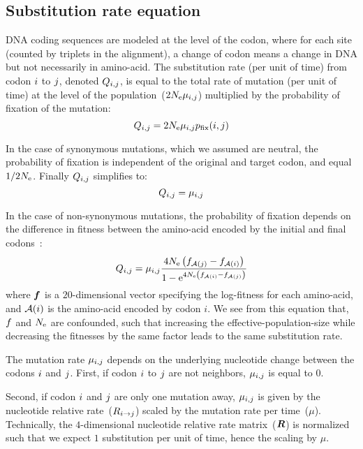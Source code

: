 \subsection{Substitution rate equation}
\label{sec:MutSelEq}
DNA coding sequences are modeled at the level of the \gls{codon}, where for each site (counted by triplets in the alignment), a change of \gls{codon} means a change in \acrshort{DNA} but not necessarily in amino-acid.
The \gls{substitution} rate (per unit of time) from \gls{codon} ${i}$ to ${j}$, denoted $Q_{{i}, {j}}$, is equal to the total rate of mutation (per unit of time) at the level of the population~($2N_{\mathrm{e}}\mu_{{i}, {j}}$) multiplied by the probability of fixation of the mutation:
\begin{equation}
{Q_{{i}, {j}}} = 2 N_{\mathrm{e}} \mu_{{i}, {j}} p_{\mathrm{fix}}({i}, {j})
\end{equation}

In the case of synonymous mutations, which we assumed are \gls{neutral}, the probability of fixation is independent of the original and target \gls{codon}, and equal $1/2 N_{\mathrm{e}}$.
Finally ${Q_{{i}, {j}}}$ simplifies to: 
\begin{equation}
Q_{{i}, {j}} = \mu_{{i}, {j}}
\end{equation}

In the case of non-synonymous mutations, the probability of fixation depends on the difference in fitness between the amino-acid encoded by the initial and final \glspl{codon}~\citep{Ohta1992}:
\begin{equation}
\label{eq:mutationSelection}
{\submatrix_{\itoj}} = \mu_{\itoj} \dfrac{4 \Ne \left({\fitj - \fiti}\right)}{{1 - \e^{4 \Ne \left({\fiti - \fitj}\right)} }}
\end{equation}
where $\bm{f}$ is a $20$-dimensional vector specifying the log-fitness for each amino-acid, and $\mathcal{A}({i})$ is the amino-acid encoded by \gls{codon} $i$.
We see from this equation that, $f$ and $N_{\mathrm{e}}$ are confounded, such that increasing the \gls{effective-population-size} while decreasing the fitnesses by the same factor leads to the same \gls{substitution} rate.

The mutation rate $\mu_{{i}, {j}}$ depends on the underlying nucleotide change between the \glspl{codon} ${i}$ and ${j}$.
First, if \gls{codon} ${i}$ to ${j}$ are not neighbors, $\mu_{{i}, {j}}$ is equal to $0$.

Second, if \gls{codon} ${i}$ and ${j}$ are only one mutation away, $\mu_{{i}, {j}}$ is given by the nucleotide relative rate~(${R_{{i} \rightarrow {j}}}$) scaled by the mutation rate per time~($\mu$).
Technically, the $4$-dimensional nucleotide relative rate matrix~($\bm{R}$) is normalized such that we expect $1$ \gls{substitution} per unit of time, hence the scaling by $\mu$.

